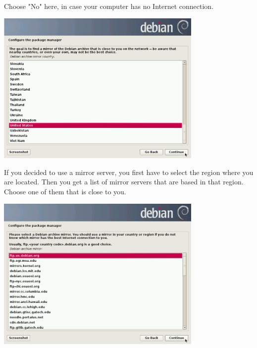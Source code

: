 \documentclass[a4paper,12pt,twoside]{article}
\begin{document}
Choose "No" here, in case your computer has
no Internet connection.

\bigskip
\begin{minipage}{\linewidth}
    \centering
    \includegraphics[width=10cm]{efaLiveen-img/efaLiveen-img15.png}
    \label{fig:mirror_region}
\end{minipage}
\bigskip

If you decided to use a mirror server, you first have to select the
region where you are located. Then you get a list of mirror servers
that are based in that region. Choose one of them that is close to you.

\bigskip
\begin{minipage}{\linewidth}
    \centering
    \includegraphics[width=10cm]{efaLiveen-img/efaLiveen-img16.png}
    \label{fig:choose_mirror}
\end{minipage}
\bigskip
\end{document}
